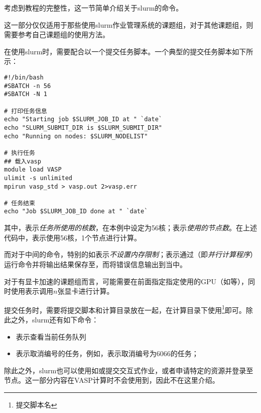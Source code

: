 考虑到教程的完整性，这一节简单介绍关于slurm的命令。

\begin{attention}
    这一部分仅仅适用于那些使用slurm作业管理系统的课题组，对于其他课题组，则需要参考自己课题组的使用方法。
\end{attention}

在使用slurm时，需要配合以一个提交任务脚本。一个典型的提交任务脚本如下所示：

\begin{lstlisting}[caption=sub.vasp]
#!/bin/bash
#SBATCH -n 56
#SBATCH -N 1

# 打印任务信息
echo "Starting job $SLURM_JOB_ID at " `date`
echo "SLURM_SUBMIT_DIR is $SLURM_SUBMIT_DIR"
echo "Running on nodes: $SLURM_NODELIST"

# 执行任务
## 载入vasp
module load VASP
ulimit -s unlimited
mpirun vasp_std > vasp.out 2>vasp.err

# 任务结束
echo "Job $SLURM_JOB_ID done at " `date`
\end{lstlisting}

其中，表示\emph{任务所使用的核数}，在本例中设定为56核；表示\emph{使用的节点数}。在上述代码中，表示使用56核，1个节点进行计算。

而对于中间的命令，特别的如表示\emph{不设置内存限制}；表示通过（即\emph{并行计算程序}）运行命令并将输出结果保存至，而将错误信息输出到当中。

\begin{extend}
    对于有显卡加速的课题组而言，可能需要在前面指定指定使用的GPU（如等），同时使用表示调用$n$张显卡进行计算。
\end{extend}

提交任务时，需要将提交脚本和计算目录放在一起，在计算目录下使用\footnote{提交脚本名}即可。除此之外，slurm还有如下命令：

\begin{itemize}
    \item {}表示查看当前任务队列
    \item {}表示取消\code{[jobID]}编号的任务，例如，表示取消编号为6066的任务；
\end{itemize}

除此之外，slurm也可以使用如或提交交互式作业，或者申请特定的资源并登录至节点。这一部分内容在VASP计算时不会使用到，因此不在这里介绍。
